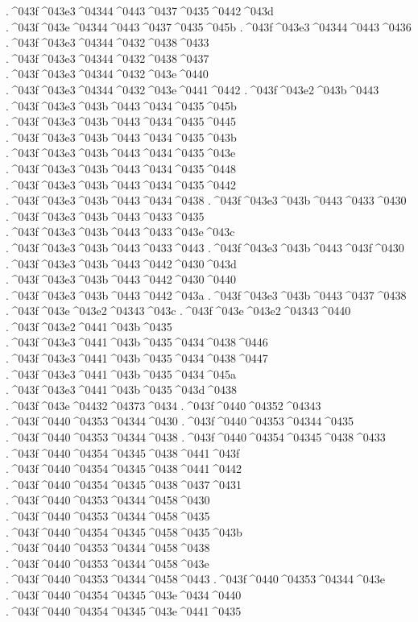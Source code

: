{.^^^^043f^^^^043e3^^^^04344^^^^0443^^^^0437^^^^0435^^^^0442^^^^043d
.^^^^043f^^^^043e^^^^04344^^^^0443^^^^0437^^^^0435^^^^045b
.^^^^043f^^^^043e3^^^^04344^^^^0443^^^^0436
.^^^^043f^^^^043e3^^^^04344^^^^0432^^^^0438^^^^0433
.^^^^043f^^^^043e3^^^^04344^^^^0432^^^^0438^^^^0437
.^^^^043f^^^^043e3^^^^04344^^^^0432^^^^043e^^^^0440
.^^^^043f^^^^043e3^^^^04344^^^^0432^^^^043e^^^^0441^^^^0442
.^^^^043f^^^^043e2^^^^043b^^^^0443
.^^^^043f^^^^043e3^^^^043b^^^^0443^^^^0434^^^^0435^^^^045b
.^^^^043f^^^^043e3^^^^043b^^^^0443^^^^0434^^^^0435^^^^0445
.^^^^043f^^^^043e3^^^^043b^^^^0443^^^^0434^^^^0435^^^^043b
.^^^^043f^^^^043e3^^^^043b^^^^0443^^^^0434^^^^0435^^^^043e
.^^^^043f^^^^043e3^^^^043b^^^^0443^^^^0434^^^^0435^^^^0448
.^^^^043f^^^^043e3^^^^043b^^^^0443^^^^0434^^^^0435^^^^0442
.^^^^043f^^^^043e3^^^^043b^^^^0443^^^^0434^^^^0438
.^^^^043f^^^^043e3^^^^043b^^^^0443^^^^0433^^^^0430
.^^^^043f^^^^043e3^^^^043b^^^^0443^^^^0433^^^^0435
.^^^^043f^^^^043e3^^^^043b^^^^0443^^^^0433^^^^043e^^^^043c
.^^^^043f^^^^043e3^^^^043b^^^^0443^^^^0433^^^^0443
.^^^^043f^^^^043e3^^^^043b^^^^0443^^^^043f^^^^0430
.^^^^043f^^^^043e3^^^^043b^^^^0443^^^^0442^^^^0430^^^^043d
.^^^^043f^^^^043e3^^^^043b^^^^0443^^^^0442^^^^0430^^^^0440
.^^^^043f^^^^043e3^^^^043b^^^^0443^^^^0442^^^^043a
.^^^^043f^^^^043e3^^^^043b^^^^0443^^^^0437^^^^0438
.^^^^043f^^^^043e^^^^043e2^^^^04343^^^^043c
.^^^^043f^^^^043e^^^^043e2^^^^04343^^^^0440
.^^^^043f^^^^043e2^^^^0441^^^^043b^^^^0435
.^^^^043f^^^^043e3^^^^0441^^^^043b^^^^0435^^^^0434^^^^0438^^^^0446
.^^^^043f^^^^043e3^^^^0441^^^^043b^^^^0435^^^^0434^^^^0438^^^^0447
.^^^^043f^^^^043e3^^^^0441^^^^043b^^^^0435^^^^0434^^^^045a
.^^^^043f^^^^043e3^^^^0441^^^^043b^^^^0435^^^^043d^^^^0438
.^^^^043f^^^^043e^^^^04432^^^^04373^^^^0434
.^^^^043f^^^^0440^^^^04352^^^^04343
.^^^^043f^^^^0440^^^^04353^^^^04344^^^^0430
.^^^^043f^^^^0440^^^^04353^^^^04344^^^^0435
.^^^^043f^^^^0440^^^^04353^^^^04344^^^^0438
.^^^^043f^^^^0440^^^^04354^^^^04345^^^^0438^^^^0433
.^^^^043f^^^^0440^^^^04354^^^^04345^^^^0438^^^^0441^^^^043f
.^^^^043f^^^^0440^^^^04354^^^^04345^^^^0438^^^^0441^^^^0442
.^^^^043f^^^^0440^^^^04354^^^^04345^^^^0438^^^^0437^^^^0431
.^^^^043f^^^^0440^^^^04353^^^^04344^^^^0458^^^^0430
.^^^^043f^^^^0440^^^^04353^^^^04344^^^^0458^^^^0435
.^^^^043f^^^^0440^^^^04354^^^^04345^^^^0458^^^^0435^^^^043b
.^^^^043f^^^^0440^^^^04353^^^^04344^^^^0458^^^^0438
.^^^^043f^^^^0440^^^^04353^^^^04344^^^^0458^^^^043e
.^^^^043f^^^^0440^^^^04353^^^^04344^^^^0458^^^^0443
.^^^^043f^^^^0440^^^^04353^^^^04344^^^^043e
.^^^^043f^^^^0440^^^^04354^^^^04345^^^^043e^^^^0434^^^^0440
.^^^^043f^^^^0440^^^^04354^^^^04345^^^^043e^^^^0441^^^^0435
}

